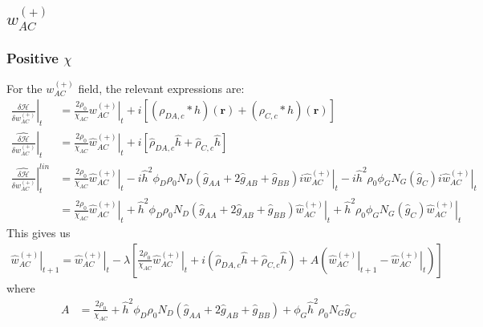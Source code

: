 \documentclass{article}
\begin{document}
  \subsection{$w_{AC}^{(+)}$}
    \subsubsection{Positive $\chi$}
  For the $w_{AC}^{(+)}$ field, the relevant expressions are:
  \begin{align*}
    \left. \frac{\delta \mathcal{H}}{\delta  w_{AC}^{(+)} } \right|_t &=
      \frac{2\rho_0}{\chi_{AC}} \left. w_{AC}^{(+)} \right|_t
      + i [ (\rho_{DA,c} \ast h)(\mathbf{r})
            + (\rho_{C,c} \ast h)(\mathbf{r}) ] \\
      \left. \hat{\frac{\delta \mathcal{H}}{\delta w_{AC}^{(+)}}} \right|_t &=
      \frac{2\rho_0}{\chi_{AC}} \left. \hat{w}_{AC}^{(+)} \right|_t
      + i [ \hat{\rho}_{DA,c} \hat{h}
            + \hat{\rho}_{C,c} \hat{h} ] \\
    \left. \hat{\frac{\delta \mathcal{H}}{\delta w_{AC}^{(+)}}} \right| ^{lin}_t &=
      \frac{2\rho_0}{\chi_{AC}} \left. \hat{w}_{AC}^{(+)} \right|_t
      - i \hat{h}^2 \phi_D \rho_0 N_D
        (\hat{g}_{AA} +  2 \hat{g}_{AB} + \hat{g}_{BB} ) i \left.
          \hat{w}_{AC}^{(+)} \right|_t - i \hat{h} ^2  {\rho}_0  
          \left. \phi_G N_G (\hat{g}_{C}) i \hat{w}_{AC}^{(+)} \right|_t
          \\
    &= \frac{2\rho_0}{\chi_{AC}} \left. \hat{w}_{AC}^{(+)} \right|_t
      + \hat{h}^2 \phi_D \rho_0 N_D
        (\hat{g}_{AA} + 2 \hat{g}_{AB} + \hat{g}_{BB})
          \left. \hat{w}_{AC}^{(+)} \right|_t + 
          \hat{h} ^2  {\rho}_0  \left. \phi_G N_G (\hat{g}_{C})  \hat{w}_{AC}^{(+)} \right|_t
  \end{align*}
  This gives us
  \begin{align*}
    \left. \hat{w}_{AC}^{(+)} \right|_{t+1} =
      \left. \hat{w}_{AC}^{(+)} \right|_t - \lambda \left[
        \frac{2\rho_0}{\chi_{AC}} \left. \hat{w}_{AC}^{(+)} \right|_t
        + i ( \hat{\rho}_{DA,c} \hat{h}
              + \hat{\rho}_{C,c} \hat{h} )
        + A ( \left. \hat{w}_{AC}^{(+)} \right|_{t+1}
              - \left. \hat{w}_{AC}^{(+)} \right|_t)
      \right]
  \end{align*}
  where
  \begin{align*}
    A &=
    \frac{2\rho_0}{\chi_{AC}}
        + \hat{h}^2 \phi_D \rho_0 N_D
          (\hat{g}_{AA} + 2 \hat{g}_{AB} + \hat{g}_{BB}) + \phi_G   \hat{h}^2  \rho_0 N_G 
          \hat{g}_{C}
  \end{align*}
\end{document}
